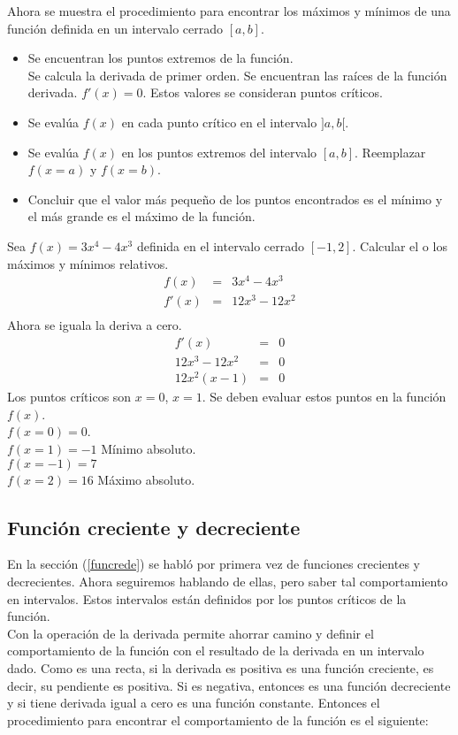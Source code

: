 Ahora se muestra el procedimiento para encontrar los máximos y mínimos de una función definida en un intervalo cerrado $[a,b]$.\\
\begin{itemize}
	\item Se encuentran los puntos extremos de la función.\\
		\subitem Se calcula la derivada de primer orden.
		\subitem Se encuentran las raíces de la función derivada. $f'(x)=0$. Estos valores se consideran puntos críticos.
	\item Se evalúa $f(x)$ en cada punto crítico en el intervalo $]a,b[$.
	\item Se evalúa $f(x)$ en los puntos extremos del intervalo $[a,b]$. Reemplazar $f(x=a)$ y $f(x=b)$.
	\item Concluir que el valor más pequeño de los puntos encontrados es el mínimo y el más grande es el máximo de la función.
\end{itemize}

\begin{myexample}
Sea $f(x)=3x^{4}-4x^{3}$ definida en el intervalo cerrado $[-1,2]$. Calcular el o los máximos y mínimos relativos.
\begin{eqnarray*}
f(x)&=& 3x^{4}-4x^{3}\\
f'(x)&=& 12x^{3}-12x^{2}\\
\end{eqnarray*}
Ahora se iguala la deriva a cero.
\begin{eqnarray*}
f'(x)&=&0\\
12x^{3}-12x^{2}&=&0\\
12x^{2}(x-1)&=&0
\end{eqnarray*}
Los puntos críticos son $x=0$, $x=1$. Se deben evaluar estos puntos en la función $f(x)$.\\

\noindent $f(x=0)=0$.\\
\noindent $f(x=1)=-1$ Mínimo absoluto.\\
\noindent $f(x=-1)=7$\\
\noindent $f(x=2)=16$ Máximo absoluto.\\
\end{myexample}

\subsection{Función creciente y decreciente}
En la sección (\ref{funcrede}) se habló por primera vez de funciones crecientes y decrecientes. Ahora seguiremos hablando de ellas, pero saber tal comportamiento en intervalos. Estos intervalos están definidos por los puntos críticos de la función.\\
Con la operación de la derivada permite ahorrar camino y definir el comportamiento de la función con el resultado de la derivada en un intervalo dado. Como es una recta, si la derivada es positiva es una función creciente, es decir, su pendiente es positiva. Si es negativa, entonces es una función decreciente y si tiene derivada igual a cero es una función constante. Entonces el procedimiento para encontrar el comportamiento de la función es el siguiente:

